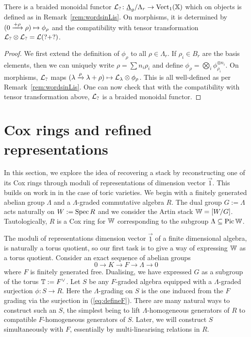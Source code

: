 \documentclass[12pt]{amsart}
\begin{document}
\begin{proposition}  \label{prop:cLfunctor}
There is a braided monoidal functor $\mathcal{L}_? \colon \underline{\Lambda}_g / \Lambda_r \to \operatorname{Vect}_1(\mathbb{X})$ which on objects is defined as in Remark~\ref{rem:wordsinLis}. On morphisms, it is determined by $(0 \xrightarrow{+ \rho} \rho) \mapsto \phi_{\rho}$ and the compatibility with tensor transformation $\mathcal{L}_? \otimes \mathcal{L}_?  = \mathcal{L}(? + ?)$.
\end{proposition}
\begin{proof}
We first extend the definition of $\phi_{\rho}$ to all $\rho \in \Lambda_r$. If $\rho_i \in B_r$ are the basis elements, then we can uniquely write $\rho = \sum n_i \rho_i$ and define $\phi_{\rho}  = \bigotimes_i \phi_{\rho_i}^{\otimes n_i}$. On morphisms, $\mathcal{L}_?$ maps $(\lambda \xrightarrow{\rho} \lambda + \rho) \mapsto \mathcal{L}_{\lambda} \otimes \phi_{\rho}$. This is all well-defined as per Remark~\ref{rem:wordsinLis}. One can now check that with the compatibility with tensor transformation above, $\mathcal{L}_?$ is a braided monoidal functor.
\end{proof}

\section{Cox rings and refined representations} \label{sec:refinedviaCox}

In this section, we explore the idea of recovering a stack by reconstructing one of its Cox rings through moduli of representations of dimension vector $\vec{1}$. This builds on work in \cite{Abd} in the case of toric varieties. We begin with a finitely generated abelian group $\Lambda$ and a $\Lambda$-graded commutative algebra $R$. The dual group $G:= \Lambda$ acts naturally on $W:=\operatorname{Spec} R$ and we consider the Artin stack $\mathbb{W} = [W/ G]$. Tautologically, $R$ is a Cox ring for $\mathbb{W}$ corresponding to the subgroup $\Lambda \subseteq \operatorname{Pic} \mathbb{W}$.

The moduli of representations dimension vector $\vec{1}$ of a finite dimensional algebra, is naturally a torus quotient, so our first task is to give a way of expressing $\mathbb{W}$ as a torus quotient. Consider an exact sequence of abelian groups 
\begin{equation} \label{eq:defineF}
     0 \to K \to F \to \Lambda \to 0
\end{equation}
where $F$ is finitely generated free. Dualising, we have expressed $G$ as a subgroup of the torus $\mathbb{T} := F^{\vee}$. Let $S$ be any $F$-graded algebra equipped with a $\Lambda$-graded surjection $\phi \colon S \to R$. Here the $\Lambda$-grading on $S$ is the one induced from the $F$ grading via the surjection in (\ref{eq:defineF}). There are many natural ways to construct such an $S$, the simplest being to lift $\Lambda$-homogeneous generators of $R$ to compatible $F$-homogeneous generators of $S$. Later, we will construct $S$ simultaneously with $F$, essentially by multi-linearising relations in $R$. 
\end{document}
